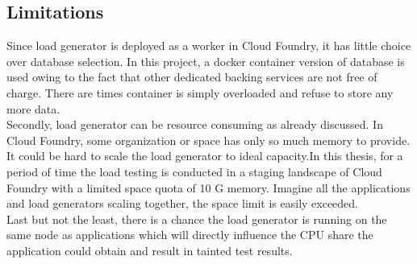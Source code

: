 \subsection{Limitations}
Since load generator is deployed as a worker in Cloud Foundry, it has little choice over database selection. In this project, a docker container version of database is used owing to the fact that other dedicated backing services are not free of charge. There are times container is simply overloaded and refuse to store any more data. \\
Secondly, load generator can be resource consuming as already discussed. In Cloud Foundry, some organization or space has only so much memory to provide. It could be hard to scale the load generator to ideal capacity.In this thesis, for a period of time the load testing is conducted in a staging landscape of Cloud Foundry with a limited space quota of 10 G memory. Imagine all the applications and load generators scaling together, the space limit is easily exceeded. \\
Last but not the least, there is a chance the load generator is running on the same node as applications which will directly influence the CPU share the application could obtain and result in tainted test results. 

